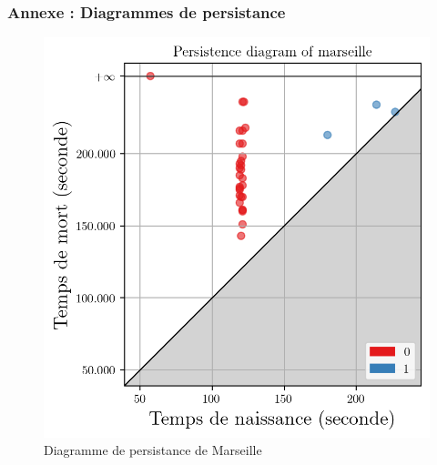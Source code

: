 \documentclass{beamer}
\begin{document}
\begin{frame}
    \frametitle{Annexe : Diagrammes de persistance}

    \begin{figure}[h]
        \begin{minipage}[c]{.45\linewidth}
            \centering
            \includegraphics[width=1\textwidth]{../../Code/images/pd_marseille.png}
            \caption{Diagramme de persistance de Marseille}
        \end{minipage}
        \hfill
        \begin{minipage}[c]{.45\linewidth}
            \centering

\end{minipage}
\end{figure}
\end{frame}
\end{document}

